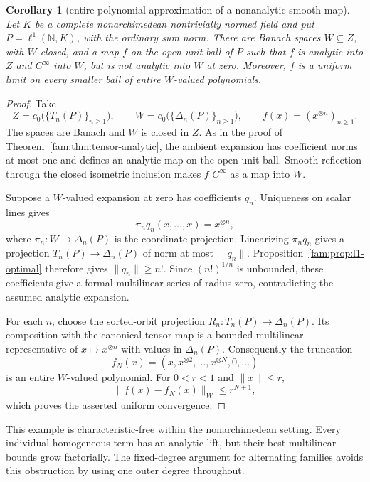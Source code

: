 \documentclass[11pt]{amsart}
\newtheorem{corollary}[theorem]{Corollary}
\theoremstyle{definition}
\theoremstyle{remark}
\numberwithin{equation}{section}
\newcommand{\N}{\mathbb N}
\newcommand{\norm}[1]{\lVert #1\rVert}
\begin{document}
\begin{corollary}[entire polynomial approximation of a nonanalytic smooth map]
\label{fam:cor:no-common-radius}
Let $K$ be a complete nonarchimedean nontrivially normed field and put
$P=\ell^1(\N,K)$, with the ordinary sum norm. There are Banach spaces
$W\subseteq Z$, with $W$ closed, and a map $f$ on the open unit ball of $P$
such that $f$ is analytic into $Z$ and $C^\infty$ into $W$, but is not analytic
into $W$ at zero. Moreover, $f$ is a uniform limit on every smaller ball of
entire $W$\nobreakdash-valued polynomials.
\end{corollary}

\begin{proof}
Take
\[
 Z=c_0\bigl(\{T_n(P)\}_{n\ge1}\bigr),\qquad
 W=c_0\bigl(\{\Delta_n(P)\}_{n\ge1}\bigr),\qquad
 f(x)=(x^{\otimes n})_{n\ge1}.
\]
The spaces are Banach and $W$ is closed in $Z$. As in the proof of
Theorem~\ref{fam:thm:tensor-analytic}, the ambient expansion has coefficient
norms at most one and defines an analytic map on the open unit ball.
Smooth reflection through the closed isometric inclusion makes $f$
$C^\infty$ as a map into $W$.

Suppose a $W$\nobreakdash-valued expansion at zero has coefficients $q_n$.
Uniqueness on scalar lines gives
\[
 \pi_nq_n(x,\ldots,x)=x^{\otimes n},
\]
where $\pi_n\colon W\to\Delta_n(P)$ is the coordinate projection.
Linearizing $\pi_nq_n$ gives a projection
$T_n(P)\to\Delta_n(P)$ of norm at most $\norm{q_n}$.
Proposition~\ref{fam:prop:l1-optimal} therefore gives
$\norm{q_n}\ge n!$. Since $(n!)^{1/n}$ is unbounded, these coefficients
give a formal multilinear series of radius zero, contradicting the assumed analytic expansion.

For each $n$, choose the sorted-orbit projection
$R_n\colon T_n(P)\to\Delta_n(P)$. Its composition with the canonical
tensor map is a bounded multilinear representative of $x\mapsto x^{\otimes n}$
with values in $\Delta_n(P)$. Consequently the truncation
\[
 f_N(x)=(x,x^{\otimes2},\ldots,x^{\otimes N},0,\ldots)
\]
is an entire $W$\nobreakdash-valued polynomial. For $0<r<1$ and $\norm x\le r$,
\[
 \norm{f(x)-f_N(x)}_W\le r^{N+1},
\]
which proves the asserted uniform convergence.
\end{proof}

This example is characteristic-free within the nonarchimedean setting.
Every individual homogeneous term has an analytic lift, but their best
multilinear bounds grow factorially. The fixed-degree argument for alternating
families avoids this obstruction by using one outer degree throughout.
\end{document}
